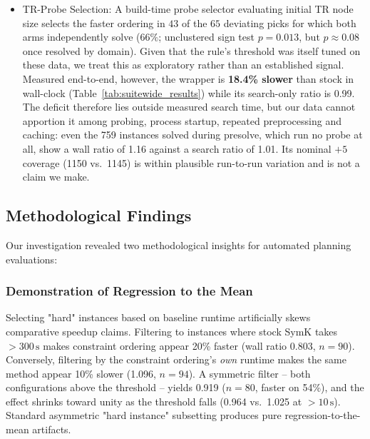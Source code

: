 \documentclass[twocolumn,10pt]{article}
\begin{document}
\begin{itemize}
    \item TR-Probe Selection: A build-time probe selector evaluating initial TR node size selects the faster ordering in $43$ of the $65$ deviating picks for which both arms independently solve ($66\%$; unclustered sign test $p = 0.013$, but $p \approx 0.08$ once resolved by domain). Given that the rule's threshold was itself tuned on these data, we treat this as exploratory rather than an established signal. Measured end-to-end, however, the wrapper is \textbf{18.4\% slower} than stock in wall-clock (Table~\ref{tab:suitewide_results}) while its search-only ratio is 0.99. The deficit therefore lies outside measured search time, but our data cannot apportion it among probing, process startup, repeated preprocessing and caching: even the 759 instances solved during presolve, which run no probe at all, show a wall ratio of 1.16 against a search ratio of 1.01. Its nominal $+5$ coverage (1150 vs.\ 1145) is within plausible run-to-run variation and is not a claim we make.
\end{itemize}

\subsection{Methodological Findings}
Our investigation revealed two methodological insights for automated planning evaluations:

\subsubsection{Demonstration of Regression to the Mean}
Selecting "hard" instances based on baseline runtime artificially skews comparative speedup claims. Filtering to instances where stock \textsf{SymK} takes $>300\,\text{s}$ makes constraint ordering appear 20\% faster (wall ratio 0.803, $n = 90$). Conversely, filtering by the constraint ordering's \emph{own} runtime makes the same method appear 10\% slower (1.096, $n = 94$). A symmetric filter -- both configurations above the threshold -- yields 0.919 ($n = 80$, faster on 54\%), and the effect shrinks toward unity as the threshold falls (0.964 vs.\ 1.025 at $>10\,\text{s}$). Standard asymmetric "hard instance" subsetting produces pure regression-to-the-mean artifacts.
\end{document}
